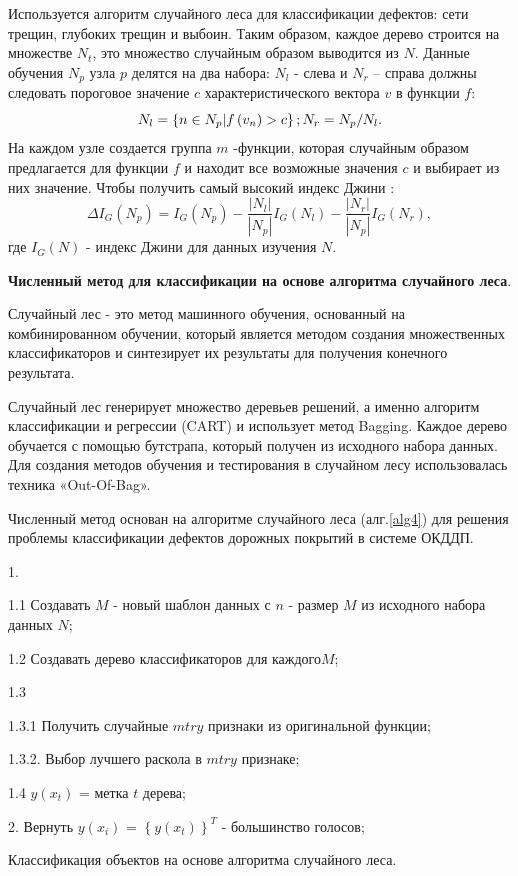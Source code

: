 \documentclass[a4paper,14pt]{extreport}
\begin{document}
Используется алгоритм случайного леса для классификации дефектов: сети трещин, глубоких трещин и выбоин. Таким образом, каждое дерево строится на множестве $N_t$, это множество случайным образом выводится из $N$. Данные обучения $N_p$ узла $p$ делятся на два набора: $N_l$ - слева и $N_r$ – справа должны следовать пороговое значение $c$ характеристического вектора $v$ в функции $f$:
\begin{equation}\label{eq11}
N_l = \left\{n \in N_p | f\left(v_n\right) > c\right\};  \\
N_r=N_p / N_l.
\end{equation}
На каждом узле создается группа $ m $ -функции, которая случайным образом предлагается для функции $ f $ и находит все возможные значения $ c $ и выбирает из них значение. Чтобы получить самый высокий индекс Джини \cite{19wl}:
\begin{equation}\label{eq12}
\Delta I_G\left(N_p\right)=I_G\left(N_p\right) - \frac{|N_l|}{|N_p|}I_G\left(N_l\right) - \frac{|N_r|}{|N_p|}I_G\left(N_r\right), 
\end{equation} где $I_G\left(N\right)$ - индекс Джини для данных изучения $N$.

\textbf{Численный метод для классификации на основе алгоритма случайного леса}.

Случайный лес - это метод машинного обучения, основанный на комбинированном обучении, который является методом создания множественных классификаторов и синтезирует их результаты для получения конечного результата.

Случайный лес генерирует множество деревьев решений, а именно алгоритм классификации и регрессии (CART) и использует метод Bagging. Каждое дерево обучается с помощью бутстрапа, который получен из исходного набора данных. Для создания методов обучения и тестирования в случайном лесу использовалась техника «Out-Of-Bag».

Численный метод основан на алгоритме случайного леса (алг.\ref{alg4}) для решения проблемы классификации дефектов дорожных покрытий в системе ОКДДП.
\begin{algorithm}[ht!]
   1. 
     {
		1.1 Создавать $M$ - новый шаблон данных с $n$ - размер $M$ из исходного набора данных $N$;
		
		1.2 Создавать дерево классификаторов для каждого$M$;
		
		1.3 
     {
		  1.3.1 Получить случайные  $mtry$ признаки из оригинальной функции;
			
			1.3.2. Выбор лучшего раскола в $mtry$ признаке;
		}
		1.4 $y\left(x_t\right)$ = метка $t$ дерева; 
		}
		
		2. Вернуть $y\left(x_i\right)$ = $\left\{y\left(x_t\right)\right\}^T$ - большинство голосов;
		
  \caption{Классификация объектов на основе алгоритма случайного леса.}\label{alg4}
	
\end{algorithm}
\end{document}
